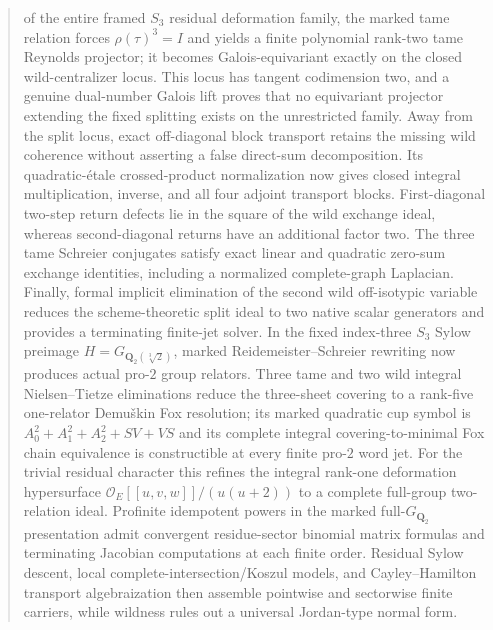 \documentclass[11pt]{article}
\theoremstyle{definition}
\begin{document}
\begin{abstract}
of the entire framed $S_3$ residual deformation family, the marked tame relation forces $\rho(\tau)^3=I$ and yields a finite polynomial rank-two tame Reynolds projector; it becomes Galois-equivariant exactly on the closed wild-centralizer locus.  This locus has tangent codimension two, and a genuine dual-number Galois lift proves that no equivariant projector extending the fixed splitting exists on the unrestricted family.  Away from the split locus, exact off-diagonal block transport retains the missing wild coherence without asserting a false direct-sum decomposition.  Its quadratic-\'etale crossed-product normalization now gives closed integral multiplication, inverse, and all four adjoint transport blocks.  First-diagonal two-step return defects lie in the square of the wild exchange ideal, whereas second-diagonal returns have an additional factor two.  The three tame Schreier conjugates satisfy exact linear and quadratic zero-sum exchange identities, including a normalized complete-graph Laplacian.  Finally, formal implicit elimination of the second wild off-isotypic variable reduces the scheme-theoretic split ideal to two native scalar generators and provides a terminating finite-jet solver.  In the fixed index-three $S_3$ Sylow preimage $H=G_{\mathbf Q_2(\sqrt[3]2)}$, marked Reidemeister--Schreier rewriting now produces actual pro-$2$ group relators.  Three tame and two wild integral Nielsen--Tietze eliminations reduce the three-sheet covering to a rank-five one-relator Demu\v{s}kin Fox resolution; its marked quadratic cup symbol is $A_0^2+A_1^2+A_2^2+SV+VS$ and its complete integral covering-to-minimal Fox chain equivalence is constructible at every finite pro-$2$ word jet.  For the trivial residual character this refines the integral rank-one deformation hypersurface $\mathcal O_E[[u,v,w]]/(u(u+2))$ to a complete full-group two-relation ideal.  Profinite idempotent powers in the marked full-$G_{\mathbf Q_2}$ presentation admit convergent residue-sector binomial matrix formulas and terminating Jacobian computations at each finite order.  Residual Sylow descent, local complete-intersection/Koszul models, and Cayley--Hamilton transport algebraization then assemble pointwise and sectorwise finite carriers, while wildness rules out a universal Jordan-type normal form.


\end{abstract}
\end{document}
